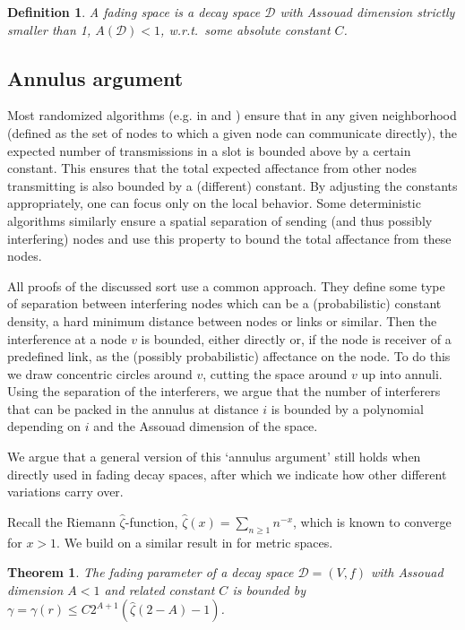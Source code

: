 \documentclass[11pt]{amsart}
\newcounter{foo}
\newtheorem{theorem}[foo]{Theorem}
\newtheorem{definition}{Definition}[section]
\def\calD{{\mathcal{D}}}
\begin{document}
\begin{definition}
A \emph{fading space} is a decay space $\calD$ with Assouad dimension
strictly smaller than 1, $A(\calD) < 1$, w.r.t.\ some absolute constant $C$.
\end{definition}

\subsection{Annulus argument}
Most randomized algorithms (e.g. in \cite{PODC13} and \cite{Yu12}) ensure that in any given neighborhood
(defined as the set of nodes to which a given node can communicate directly),
the expected number of transmissions in a slot is bounded above by a certain constant.
This ensures that the total expected affectance from other nodes transmitting
is also bounded by a (different) constant.
By adjusting the constants appropriately, one can focus only on the local behavior.
Some deterministic algorithms similarly ensure a spatial separation of sending (and thus possibly interfering) nodes and use this property to bound the total affectance from these nodes.

All proofs of the discussed sort use a common approach.  They define
some type of separation between interfering nodes which can be a
(probabilistic) constant density, a hard minimum distance between
nodes or links or similar.  Then the interference at a node $v$ is
bounded, either directly or, if the node is receiver of a
predefined link, as the (possibly probabilistic) affectance on the
node.  To do this we draw concentric circles around $v$, cutting the
space around $v$ up into annuli.  Using the separation of the
interferers, we argue that the number of interferers that can be
packed in the annulus at distance $i$ is bounded by a polynomial
depending on $i$ and the Assouad dimension of the
space.  

We argue that a general version of this `annulus argument' still holds
when directly used in fading decay spaces, after which we indicate
how other different variations carry over.

Recall the Riemann $\hat{\zeta}$-function,  $\hat{\zeta}(x) = \sum_{n \ge 1} n^{-x}$, which is known to converge for $x > 1$.
We build on a similar result in \cite{us:talg12} for metric spaces.



\begin{theorem}\label{annulusargument}
The fading parameter of a decay space $\calD = (V,f)$  with Assouad
dimension $A < 1$ and related constant $C$ is bounded by $\gamma = 
\gamma(r) \le C 2^{A+1}(\hat{\zeta}(2-A)-1)$. 
\end{theorem}
\end{document}
